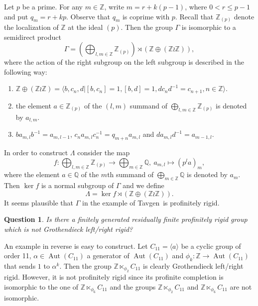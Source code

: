 \documentclass{amsart}
\newtheorem{Question}[Conj]{Question}
\theoremstyle{definition}
\theoremstyle{remark}
\DeclareMathOperator{\Aut}{Aut}
\newcommand{\Z}{\mathbb{Z}}
\newcommand{\Q}{\mathbb{Q}}
\begin{document}
Let $p$ be a prime. For any $m\in \Z$, write $m=r+k(p-1)$, where $0<r\le p-1$ and put $q_m=r+kp$. 
Observe that $q_m$ is coprime with $p$. Recall that $\Z_{(p)}$  denote the localization of $\Z$  at the ideal $(p)$. 
Then the group $\Gamma$ is isomorphic to a semidirect product $$\Gamma=\left (\bigoplus_{l,m\in \Z} \Z_{(p)} \right )\rtimes \left  (\Z\oplus (\Z\wr \Z) \right ),$$
 where the action of the right subgroup on the left subgroup is described in the following way:

\begin{enumerate}
\item $ \Z\oplus (\Z\wr \Z)=\langle b,c_n, d| [b,c_n]=1, [b,d]=1, dc_nd^{-1}=c_{n+1}, n\in \Z\rangle$.
\item the element $a\in\Z_{(p)}$ of the $(l,m)$ summand of $\displaystyle \bigoplus_{l,m\in \Z} \Z_{(p)}$ is denoted by $a_{l,m}$.
\item $ba_{m,l}b^{-1}=a_{m,l-1}$, $c_na_{m,l}c_n^{-1}=q_{m+n}a_{m,l}$ and $da_{m,l}d^{-1}=a_{m-1,l}$.
\end{enumerate}

In order to construct $\Lambda$ consider the map $$f:\displaystyle \bigoplus_{l,m\in \Z} \Z_{(p)}\to \displaystyle \bigoplus_{m\in \Z} \Q,\ a_{m,l}\mapsto (p^la)_m,$$ where  the element $a\in\Q$ of the $m$th summand of $\displaystyle \bigoplus_{m\in \Z} \Q$ is denoted by $a_m$. Then $\ker f$ is a normal subgroup of $\Gamma$ and we define
 $$\Lambda=\ker f \rtimes \left  (\Z\oplus (\Z\wr \Z) \right ).$$
It seems plausible that $\Gamma$ in the example of Tavgen\textquotesingle\ is profinitely rigid.  
\begin{Question}
Is there a finitely generated residually finite  profinitely rigid group which is not Grothendieck left/right rigid?
\end{Question}
 
 
 An example in reverse is easy to construct. Let 
$C_{11}=\langle a\rangle $ be a cyclic group  of order 11,  $\alpha \in \Aut(C_{11}) $ a generator of $\Aut(C_{11})$ and $\phi_k:\Z\to \Aut(C_{11})$ that sends $1$ to $\alpha^k$. Then the group $\Z\ltimes _{\phi_2} C_{11}$ is clearly   Grothendieck left/right rigid. However, it is not profinitely rigid since its profinite completion is isomorphic to the one of   $\Z\ltimes _{\phi_6} C_{11}$ and the groups  $\Z\ltimes _{\phi_2} C_{11}$ and $\Z\ltimes _{\phi_6} C_{11}$ are not isomorphic.
\end{document}
